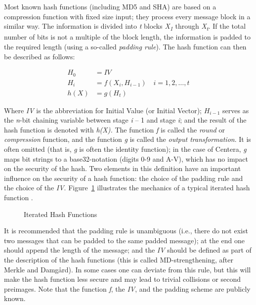 Most known hash functions (including MD5 and SHA) are based on a
compression function with fixed size input; they process every message
block in a similar way. The information is divided into \emph{t} blocks
\emph{X}\textsubscript{\emph{1}} through
\emph{X}\textsubscript{\emph{t}}. If the total number of bits is not a
multiple of the block length, the information is padded to the required
length (using a so-called \emph{padding rule}). The hash function can
then be described as follows:

\begin{equation}\label{eq:2.1}
\begin{aligned}H_0&=IV\\H_i&=f(X_i,H_{i-1})\quad i=1,2,\ldots,t\\h(X)&=g(H_t)\end{aligned}
\end{equation}

Where \emph{IV} is the abbreviation for Initial Value (or Initial
Vector); \(H_{i-1}\) serves as the \emph{n}-bit chaining variable
between stage \emph{i} -- 1 and stage \emph{i}; and the result of the
hash function is denoted with \emph{h(X).} The function \emph{f} is
called the \emph{round} or \emph{compression} function, and the function
\emph{g} is called the \emph{output transformation}. It is often omitted
(that is, \emph{g} is often the identity function); in the case of
Centera, \emph{g} maps bit strings to a base32-notation (digits 0-9 and
A-V), which has no impact on the security of the hash. Two elements in
this definition have an important influence on the security of a hash
function: the choice of the padding rule and the choice of the
\emph{IV}. Figure~\ref{fig:iterated-hash} illustrates the mechanics of a typical
iterated hash function \cite{ref2}.

\begin{figure}[htbp]\centering\caption{Iterated Hash Functions}\label{fig:iterated-hash}\end{figure}

It is recommended that the padding rule is unambiguous (i.e., there do
not exist two messages that can be padded to the same padded message);
at the end one should append the length of the message; and the
\emph{IV} should be defined as part of the description of the hash
functions (this is called MD-strengthening, after Merkle and Damgård).
In some cases one can deviate from this rule, but this will make the
hash function less secure and may lead to trivial collisions or second
preimages. Note that the function \emph{f}, the \emph{IV}, and the
padding scheme are publicly known.

